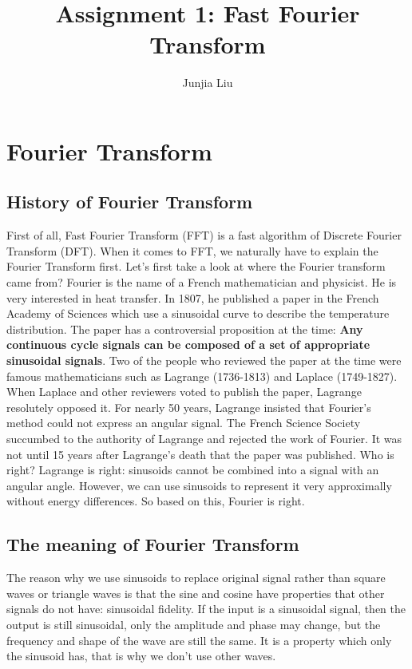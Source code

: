 \documentclass[12pt,a4paper]{article}
\author{Junjia Liu}
\affil{School of Mechanical Engineering, Shanghai Jiaotong University, junjialiu@sjtu.edu.cn}
\title{\textbf{Assignment 1: Fast Fourier Transform}}
\begin{document}

\maketitle

\tableofcontents
\newpage

\section{Fourier Transform}
\subsection{History of Fourier Transform}
First of all, Fast Fourier Transform (FFT) is a fast algorithm of Discrete Fourier Transform (DFT). When it comes to FFT, we naturally have to explain the Fourier Transform first. Let's first take a look at where the Fourier transform came from? Fourier is the name of a French mathematician and physicist. He is very interested in heat transfer. In 1807, he published a paper in the French Academy of Sciences which use a sinusoidal curve to describe the temperature distribution. The paper has a controversial proposition at the time: \textbf{Any continuous cycle signals can be composed of a set of appropriate sinusoidal signals}. Two of the people who reviewed the paper at the time were famous mathematicians such as Lagrange (1736-1813) and Laplace (1749-1827). When Laplace and other reviewers voted to publish the paper, Lagrange resolutely opposed it. For nearly 50 years, Lagrange insisted that Fourier's method could not express an angular signal. The French Science Society succumbed to the authority of Lagrange and rejected the work of Fourier. It was not until 15 years after Lagrange’s death that the paper was published. Who is right? Lagrange is right: sinusoids cannot be combined into a signal with an angular angle. However, we can use sinusoids to represent it very approximally without energy differences. So based on this, Fourier is right.
\subsection{The meaning of Fourier Transform}
The reason why we use sinusoids to replace original signal rather than square waves or triangle waves is that the sine and cosine have properties that other signals do not have: sinusoidal fidelity. If the input is a sinusoidal signal, then the output is still sinusoidal, only the amplitude and phase may change, but the frequency and shape of the wave are still the same. It is a property which only the sinusoid has, that is why we don't use other waves. \\
\end{document}
